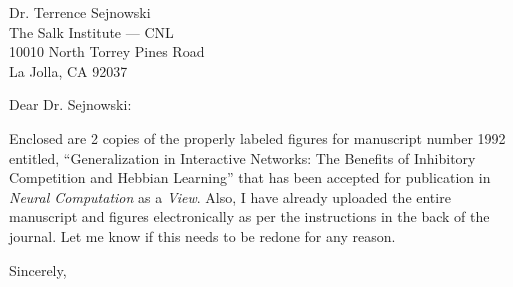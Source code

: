 \documentclass [11pt]{letter}
\begin{document}
\begin{letter}
{Dr. Terrence Sejnowski\\
The Salk Institute --- CNL\\
10010 North Torrey Pines Road\\
La Jolla, CA 92037\\}

\opening{Dear Dr. Sejnowski:}

Enclosed are 2 copies of the properly labeled figures for manuscript
number 1992 entitled, ``Generalization in Interactive Networks: The
Benefits of Inhibitory Competition and Hebbian Learning'' that has
been accepted for publication in {\em Neural Computation} as a {\em
  View}.  Also, I have already uploaded the entire manuscript and
figures electronically as per the instructions in the back of the
journal.  Let me know if this needs to be redone for any reason.

\closing{Sincerely,}

\end{letter}
\end{document}
